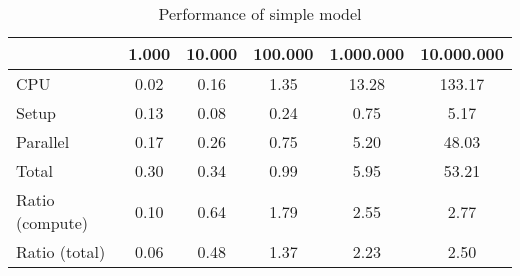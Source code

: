 \begin{table}[!h]
\centering
\caption{Performance of simple model}
\begin{tabular}{l*{5}{c}}\hline
& 1.000 &          10.000 &         100.000 &       1.000.000 &      10.000.000 \\ \hline
CPU &     0.02 &      0.16 &      1.35 &     13.28 &    133.17 \\
Setup &     0.13 &      0.08 &      0.24 &      0.75 &      5.17 \\
Parallel &     0.17 &      0.26 &      0.75 &      5.20 &     48.03 \\
Total &     0.30 &      0.34 &      0.99 &      5.95 &     53.21 \\
Ratio (compute) &     0.10 &      0.64 &      1.79 &      2.55 &      2.77 \\
Ratio (total) &     0.06 &      0.48 &      1.37 &      2.23 &      2.50 \\
\hline
\end{tabular}
\end{table}
